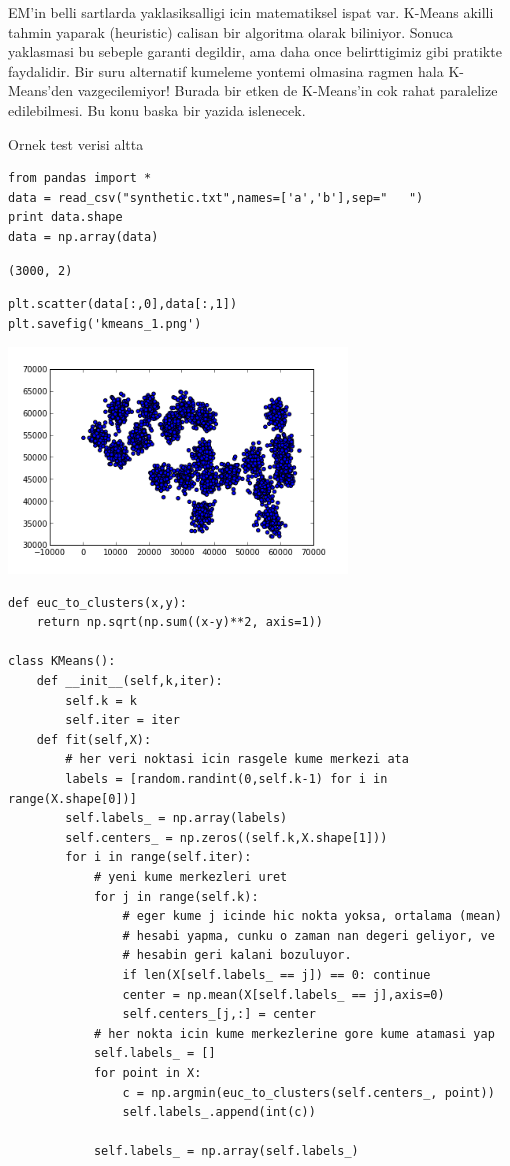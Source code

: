 \documentclass[12pt,fleqn]{article}\usepackage{../common}
\begin{document}
EM'in belli sartlarda yaklasiksalligi icin matematiksel ispat
var. K-Means akilli tahmin yaparak (heuristic) calisan bir algoritma
olarak biliniyor. Sonuca yaklasmasi bu sebeple garanti degildir, ama
daha once belirttigimiz gibi pratikte faydalidir. Bir suru alternatif
kumeleme yontemi olmasina ragmen hala K-Means'den vazgecilemiyor!
Burada bir etken de K-Means'in cok rahat paralelize edilebilmesi. Bu
konu baska bir yazida islenecek.

Ornek test verisi altta

\begin{verbatim}
from pandas import *
data = read_csv("synthetic.txt",names=['a','b'],sep="   ")
print data.shape
data = np.array(data)
\end{verbatim}

\begin{verbatim}
(3000, 2)
\end{verbatim}

\begin{verbatim}
plt.scatter(data[:,0],data[:,1])
plt.savefig('kmeans_1.png')
\end{verbatim}

\includegraphics[height=6cm]{kmeans_1.png}
\begin{verbatim}
def euc_to_clusters(x,y):
    return np.sqrt(np.sum((x-y)**2, axis=1))

class KMeans():
    def __init__(self,k,iter):
        self.k = k
        self.iter = iter
    def fit(self,X):
        # her veri noktasi icin rasgele kume merkezi ata
        labels = [random.randint(0,self.k-1) for i in range(X.shape[0])]
        self.labels_ = np.array(labels)
        self.centers_ = np.zeros((self.k,X.shape[1]))
        for i in range(self.iter):
            # yeni kume merkezleri uret
            for j in range(self.k):
                # eger kume j icinde hic nokta yoksa, ortalama (mean)
                # hesabi yapma, cunku o zaman nan degeri geliyor, ve
                # hesabin geri kalani bozuluyor.
                if len(X[self.labels_ == j]) == 0: continue
                center = np.mean(X[self.labels_ == j],axis=0)
                self.centers_[j,:] = center
            # her nokta icin kume merkezlerine gore kume atamasi yap
            self.labels_ = []
            for point in X:
                c = np.argmin(euc_to_clusters(self.centers_, point))
                self.labels_.append(int(c))

            self.labels_ = np.array(self.labels_)
\end{verbatim}
\end{document}
